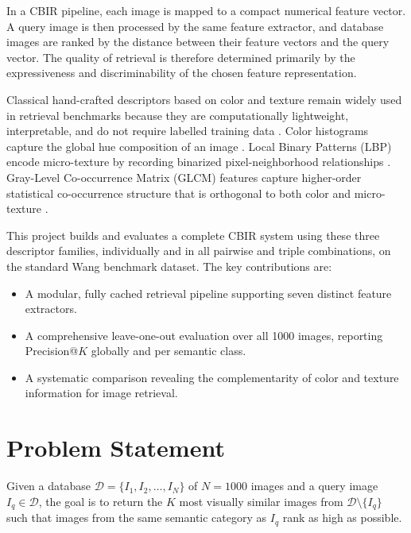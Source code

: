 \documentclass[12pt, a4paper]{article}
\begin{document}
In a CBIR pipeline, each image is mapped to a compact numerical feature vector. A query
image is then processed by the same feature extractor, and database images are ranked by
the distance between their feature vectors and the query vector. The quality of retrieval is
therefore determined primarily by the expressiveness and discriminability of the chosen
feature representation.

Classical hand-crafted descriptors based on color and texture remain widely used in retrieval
benchmarks because they are computationally lightweight, interpretable, and do not require
labelled training data \cite{rui1999}. Color histograms capture the global hue composition of an
image \cite{swain1991}. Local Binary Patterns (LBP) encode micro-texture by recording
binarized pixel-neighborhood relationships \cite{ojala2002}. Gray-Level Co-occurrence
Matrix (GLCM) features capture higher-order statistical co-occurrence structure that is
orthogonal to both color and micro-texture \cite{haralick1973}.

This project builds and evaluates a complete CBIR system using these three descriptor
families, individually and in all pairwise and triple combinations, on the standard Wang
benchmark dataset. The key contributions are:

\begin{itemize}[noitemsep]
    \item A modular, fully cached retrieval pipeline supporting seven distinct feature extractors.
    \item A comprehensive leave-one-out evaluation over all 1000 images, reporting
          Precision@$K$ globally and per semantic class.
    \item A systematic comparison revealing the complementarity of color and texture
          information for image retrieval.
\end{itemize}

\section{Problem Statement}

Given a database $\mathcal{D} = \{I_1, I_2, \ldots, I_N\}$ of $N = 1000$ images and a
query image $I_q \in \mathcal{D}$, the goal is to return the $K$ most visually similar images
from $\mathcal{D} \setminus \{I_q\}$ such that images from the same semantic category as
$I_q$ rank as high as possible.
\end{document}
